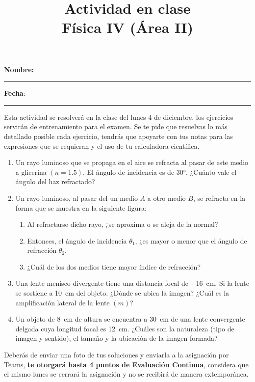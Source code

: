 \documentclass[14pt]{extarticle}
\title{\vspace*{-2cm} Actividad en clase \\ \large{Física IV (Área II)} \vspace{-5ex}}
\date{}
\newcommand{\arrowIn}{\tikz \draw[-stealth, line width=0.7mm] (-1pt,0) -- (1pt,0);}
\begin{document}
\maketitle

\textbf{Nombre:} \rule{6cm}{0.1mm} \hspace{0.5cm} \textbf{Fecha}: \rule{3cm}{0.1mm}

\vspace*{0.5cm}
Esta actividad se resolverá en la clase del lunes 4 de diciembre, los ejercicios servirán de entrenamiento para el examen. Se te pide que resuelvas lo más detallado posible cada ejercicio, tendrás que apoyarte con tus notas para las expresiones que se requieran y el uso de tu calculadora científica.

\begin{enumerate}
\item Un rayo luminoso que se propaga en el aire se refracta al pasar de este medio a glicerina $(n = 1.5)$. El ángulo de incidencia es de \ang{30}. ¿Cuánto vale el ángulo del haz refractado?
\item Un rayo luminoso, al pasar del un medio $A$ a otro medio $B$, se refracta en la forma que se muestra en la siguiente figura:

\vspace*{1cm}
\begin{figure}[H]
\centering
{}
\end{figure}
\begin{enumerate}[label=\roman*)]
\item Al refractarse dicho rayo, ¿se aproxima o se aleja de la normal?
\item Entonces, el ángulo de incidencia $\theta_{1}$, ¿es mayor o menor que el ángulo de refracción $\theta_{2}$.
\item ¿Cuál de los dos medios tiene mayor índice de refracción?
\end{enumerate}
\item Una lente menisco divergente tiene una distancia focal de \SI{-16}{\centi\meter}. Si la lente se sostiene a \SI{10}{\centi\meter} del objeto. ¿Dónde se ubica la imagen? ¿Cuál es la amplificación lateral de la lente $(m)$?
\item Un objeto de \SI{8}{\centi\meter} de altura se encuentra a \SI{30}{\centi\meter} de una lente convergente delgada cuya longitud focal es \SI{12}{\centi\meter}. ¿Cuáles son la naturaleza (tipo de imagen y sentido), el tamaño y la ubicación de la imagen formada?
\end{enumerate}

Deberás de enviar una foto de tus soluciones y enviarla a la asignación por Teams, \textbf{te otorgará hasta 4 puntos de Evaluación Continua}, considera que el mismo lunes se cerrará la asignación y no se recibirá de manera extemporánea.
\end{document}
